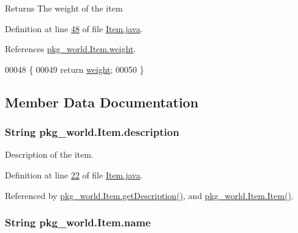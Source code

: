 \begin{DoxyReturn}{Returns}
The weight of the item 
\end{DoxyReturn}


Definition at line \hyperlink{Item_8java_source_l00048}{48} of file \hyperlink{Item_8java_source}{Item.\-java}.



References \hyperlink{Item_8java_source_l00017}{pkg\-\_\-world.\-Item.\-weight}.


\begin{DoxyCode}
00048                            \{
00049         \textcolor{keywordflow}{return} \hyperlink{classpkg__world_1_1Item_aa5dd085ecf4205cb6e2b316ab5509731}{weight};
00050     \}
\end{DoxyCode}


\subsection{Member Data Documentation}
\hypertarget{classpkg__world_1_1Item_a4fc495152cec2a97508ed5c1749b887f}{
\subsubsection[{description}]{\setlength{\rightskip}{0pt plus 5cm}String pkg\-\_\-world.\-Item.\-description\hspace{0.3cm}{\ttfamily [private]}}}\label{classpkg__world_1_1Item_a4fc495152cec2a97508ed5c1749b887f}


Description of the item. 



Definition at line \hyperlink{Item_8java_source_l00022}{22} of file \hyperlink{Item_8java_source}{Item.\-java}.



Referenced by \hyperlink{Item_8java_source_l00056}{pkg\-\_\-world.\-Item.\-get\-Description()}, and \hyperlink{Item_8java_source_l00030}{pkg\-\_\-world.\-Item.\-Item()}.

\hypertarget{classpkg__world_1_1Item_a69341bebf4daf5856e2bc03f9530bfc8}{
\subsubsection[{name}]{\setlength{\rightskip}{0pt plus 5cm}String pkg\-\_\-world.\-Item.\-name\hspace{0.3cm}{\ttfamily [private]}}}\label{classpkg__world_1_1Item_a69341bebf4daf5856e2bc03f9530bfc8}


